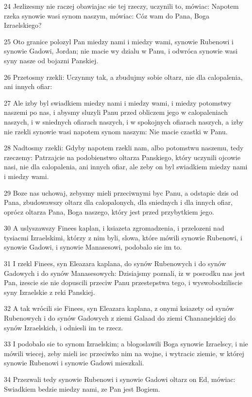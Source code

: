 \par 24 Jezlizesmy nie raczej obawiajac sie tej rzeczy, uczynili to, mówiac: Napotem rzeka synowie wasi synom naszym, mówiac: Cóz wam do Pana, Boga Izraelskiego?
\par 25 Oto granice polozyl Pan miedzy nami i miedzy wami, synowie Rubenowi i synowie Gadowi, Jordan; nie macie wy dzialu w Panu, i odwróca synowie wasi syny nasze od bojazni Panskiej.
\par 26 Przetosmy rzekli: Uczynmy tak, a zbudujmy sobie oltarz, nie dla calopalenia, ani innych ofiar:
\par 27 Ale izby byl swiadkiem miedzy nami i miedzy wami, i miedzy potomstwy naszemi po nas, i abysmy sluzyli Panu przed obliczem jego w calopaleniach naszych, i w sniednych ofiarach naszych, i w spokojnych ofiarach naszych, a izby nie rzekli synowie wasi napotem synom naszym: Nie macie czastki w Panu.
\par 28 Nadtosmy rzekli: Gdyby napotem rzekli nam, albo potomstwu naszemu, tedy rzeczemy: Patrzajcie na podobienstwo oltarza Panskiego, który uczynili ojcowie nasi, nie dla calopalenia, ani innych ofiar, ale zeby on byl swiadkiem miedzy nami i miedzy wami.
\par 29 Boze nas uchowaj, zebysmy mieli przeciwnymi byc Panu, a odstapic dzis od Pana, zbudowawszy oltarz dla calopalonych, dla sniednych i dla innych ofiar, oprócz oltarza Pana, Boga naszego, który jest przed przybytkiem jego.
\par 30 A uslyszawszy Finees kaplan, i ksiazeta zgromadzenia, i przelozeni nad tysiacmi Izraelskimi, którzy z nim byli, slowa, które mówili synowie Rubenowi, i synowie Gadowi, i synowie Manasesowi, podobalo sie im to.
\par 31 I rzekl Finees, syn Eleazara kaplana, do synów Rubenowych i do synów Gadowych i do synów Manasesowych: Dzisiajsmy poznali, iz w posrodku nas jest Pan, izescie sie nie dopuscili przeciw Panu przestepstwa tego, i wyswobodziliscie syny Izraelskie z reki Panskiej.
\par 32 A tak wrócili sie Finees, syn Eleazara kaplana, z onymi ksiazety od synów Rubenowych i do synów Gadowych z ziemi Galaad do ziemi Chananejskiej do synów Izraelskich, i odniesli im te rzecz.
\par 33 I podobalo sie to synom Izraelskim; a blogoslawili Boga synowie Izraelscy, i nie mówili wiecej, zeby mieli isc przeciwko nim na wojne, i wytracic ziemie, w której synowie Rubenowi i synowie Gadowi mieszkali.
\par 34 Przezwali tedy synowie Rubenowi i synowie Gadowi oltarz on Ed, mówiac: Swiadkiem bedzie miedzy nami, ze Pan jest Bogiem.

